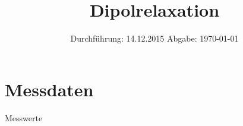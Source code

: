 

\subject{V48}
\title{Dipolrelaxation}
\date{
  Durchführung: 14.12.2015
  \hspace{3em}
  Abgabe: \today
}



\maketitle
\thispagestyle{empty}
\tableofcontents
\newpage



% 


\printbibliography

\appendix

\section{Messdaten}
\begin{table}
  \caption{Messwerte}\label{tab:data}
  \hfill%
  \hfill%
  \hfill%
  \hfill%
\end{table}



